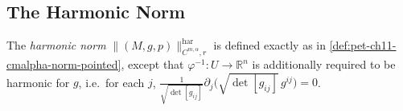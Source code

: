 \subsection{The Harmonic Norm}

\begin{definition}
  \label{def:pet-ch11-harmonic-norm}
  The \emph{harmonic norm} $\|(M,g,p)\|^{\mathrm{har}}_{C^{m,\alpha},r}$ is
  defined exactly as in \cref{def:pet-ch11-cmalpha-norm-pointed}, except that
  $\varphi^{-1}:U\to\mathbb{R}^n$ is additionally required to be harmonic for
  $g$, i.e.\ for each $j$,
  $\frac1{\sqrt{\det[g_{ij}]}}\partial_j\big(\sqrt{\det[g_{ij}]}\,g^{ij}\big)=0$.
\end{definition}

